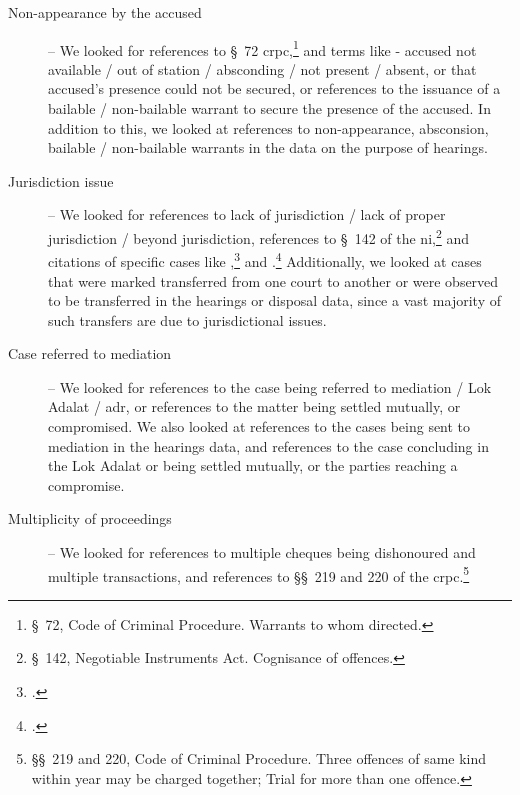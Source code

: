 \begin{description}
\item [Non-appearance by the accused] -- We looked for references to \S~72 \gls{crpc},\footnote{\S~72, Code of Criminal Procedure. Warrants to whom directed.} and terms like - accused not available / out of station / absconding / not present / absent, or that accused’s presence could not be secured, or references to the issuance of a bailable / non-bailable warrant to secure the presence of the accused. In addition to this, we looked at references to non-appearance, absconsion, bailable / non-bailable warrants in the data on the purpose of hearings.

\item[]

\item [Jurisdiction issue] -- We looked for references to lack of jurisdiction / lack of proper jurisdiction / beyond jurisdiction, references to \S~142 of the \gls{ni},\footnote{\S~142, Negotiable Instruments Act. Cognisance of offences.} and citations of specific cases like ,\footcite{sc2014_dhanuka} and .\footcite{sc2016_carbon} Additionally, we looked at cases that were marked transferred from one court to another or were observed to be transferred in the hearings or disposal data, since a vast majority of such transfers are due to jurisdictional issues.

\item[]

\item [Case referred to mediation] -- We looked for references to the case being referred to mediation / Lok Adalat / \gls{adr}, or references to the matter being settled mutually, or compromised. We also looked at references to the cases being sent to mediation in the hearings data, and references to the case concluding in the Lok Adalat or being settled mutually, or the parties reaching a compromise.

\item[]

\item [Multiplicity of proceedings] -- We looked for references to multiple cheques being dishonoured and multiple transactions, and references to \S\S~219 and 220 of the \gls{crpc}.\footnote{\S\S~219 and 220, Code of Criminal Procedure. Three offences of same kind within year may be charged together; Trial for more than one offence.}

\item[]


\end{description}
